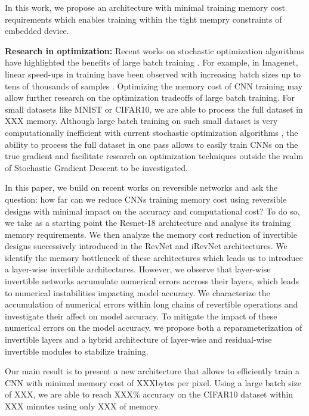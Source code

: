 \documentclass[twocolumn]{bmcart}
\begin{document}
In this work, we propose an architecture with minimal training memory cost requirements which enables training within the tight mempry constraints of embedded device. 

\textbf{Research in optimization:}
Recent works on stochastic optimization algorithms have highlighted the benefits of large batch training \cite{}.
For example, in Imagenet, linear speed-ups in training have been observed with increasing batch sizes up to tens of thousands of samples \cite{}.
Optimizing the memory cost of CNN training may allow further research on the optimization tradeoffs of large batch training.
For small datasets like MNIST or CIFAR10, we are able to process the full dataset in XXX memory.
Although large batch training on such small dataset is very computationally inefficient with current stochastic optimization algorithms \cite{},
the ability to process the full dataset in one pass allows to easily train CNNs on the true gradient and 
facilitate research on optimization techniques outside the realm of Stochastic Gradient Descent to be investigated.

In this paper, we build on recent works on reversible networks \cite{} and ask the question: 
how far can we reduce CNNs training memory cost using reversible designs with minimal impact on the accuracy and computational cost?
To do so, we take as a starting point the Resnet-18 architecture and analyse its training memory requirements.
We then analyze the memory cost reduction of invertible designs successively introduced in the RevNet and iRevNet architectures.
We identify the memory bottleneck of these architectures which leads us to introduce a layer-wise invertible architectures.
However, we observe that layer-wise invertible networks accumulate numerical errors accross their layers, which leads to numerical instabilities impacting model accuracy.  
We characterize the accumulation of numerical errors within long chains of revertible operations and investigate their affect on model accuracy.
To mitigate the impact of these numerical errors on the model accuracy, we propose both a reparameterization of invertible layers and a hybrid architecture of layer-wise and residual-wise invertible modules to stabilize training.

Our main result is to present a new architecture that allows to efficiently train a CNN with minimal memory cost of XXXbytes per pixel.
Using a large batch size of XXX, we are able to reach XXX\% accuracy on the CIFAR10 dataset within XXX minutes using only XXX of memory. 
\end{document}
